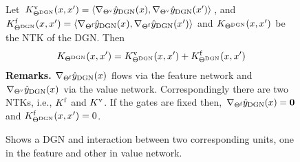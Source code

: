 \begin{figure}[h]
\begin{minipage}{0.38\columnwidth}
\caption{\small{Shows a DGN and interaction between two corresponding units, one in the feature and other in value network.}}
\label{fig:dgn}
\end{minipage}
\hfill
\begin{minipage}{0.55\columnwidth}
\begin{proposition}\label{prop:ntks} Let $K^{\text{v}}_{\Theta^{\text{DGN}}}(x,x')=\langle  \nabla_{{\Theta}^{\text{v}}}\hat{y}_{\text{DGN}}(x), \nabla_{{\Theta}^{\text{v}}}\hat{y}_{\text{DGN}}(x')\rangle$, and  $K^{\text{f}}_{\Theta^{\text{DGN}}}(x,x')=\langle  \nabla_{\Theta^{\textrm{f}}}\hat{y}_{\text{DGN}}(x), \nabla_{\Theta^{\textrm{f}}}\hat{y}_{\text{DGN}}(x') \rangle$ and $K_{\Theta^{\text{DGN}}}(x,x')$ be the NTK of the DGN. Then 
\begin{align*}
K_{\Theta^{\text{DGN}}}(x,x')=K^{\text{v}}_{\Theta^{\text{DGN}}}(x,x')+K^{\text{f}}_{\Theta^{\text{DGN}}}(x,x')
\end{align*}
\textbf{Remarks.} $\nabla_{\Theta^{\textrm{f}}}\hat{y}_{\text{DGN}}(x)$ flows via the feature network and $\nabla_{{\Theta}^{\text{v}}}\hat{y}_{\text{DGN}}(x)$ via the value network. Correspondingly there are two NTKs, i.e., $K^{\text{f}}$ and $K^{\text{v}}$. If the gates are fixed then, $\nabla_{\Theta^{\textrm{f}}}\hat{y}_{\text{DGN}}(x)=\mathbf{0}$ and $K^{\text{f}}_{\Theta^{\text{DGN}}}(x,x')=0$. 
\end{proposition}

\end{minipage}
\end{figure}
